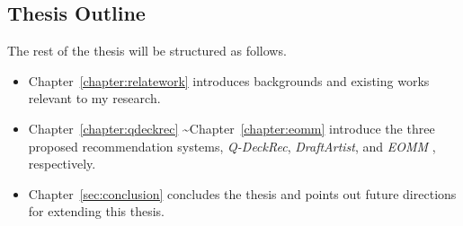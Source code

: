 \subsection{Thesis Outline}
The rest of the thesis will be structured as follows. 
\begin{itemize}
\item Chapter~\ref{chapter:relatework} introduces backgrounds and existing works relevant to my research. 
\item Chapter~\ref{chapter:qdeckrec} \textasciitilde  Chapter~\ref{chapter:eomm} introduce the three proposed recommendation systems, \textit{Q-DeckRec}, \textit{DraftArtist}, and \textit{EOMM} , respectively.
\item Chapter~\ref{sec:conclusion} concludes the thesis and points out future directions for extending this thesis.
\end{itemize}


